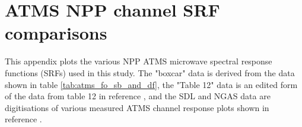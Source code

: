 \section{ATMS NPP channel SRF comparisons}
\label{app:srf}
This appendix plots the various NPP ATMS microwave spectral response functions (SRFs) used in this study. The "boxcar" data is derived from the data shown in table \ref{tab:atms_fo_sb_and_df}, the "Table 12" data is an edited form of the data from table 12 in reference \cite{ATMS_PFM_CalLog}, and the SDL \cite{ATMS_SRF_SDL} and NGAS \cite{ATMS_SRF_NGAS} data are digitisations of various measured ATMS channel response plots shown in reference \cite{ATMS_PFM_CalLog}.

\newpage



